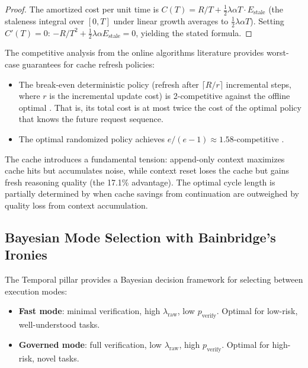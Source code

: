 \documentclass[11pt, a4paper]{googledeepmind}
\begin{document}
\begin{proof}
The amortized cost per unit time is $C(T) = R/T + \frac{1}{2}\lambda\alpha T \cdot E_{\mathrm{stale}}$ (the staleness integral over $[0, T]$ under linear growth averages to $\frac{1}{2}\lambda\alpha T$). Setting $C'(T) = 0$: $-R/T^2 + \frac{1}{2}\lambda\alpha E_{\mathrm{stale}} = 0$, yielding the stated formula.
\end{proof}

The competitive analysis from the online algorithms literature provides worst-case guarantees for cache refresh policies:

\begin{itemize}[nosep]
    \item The break-even deterministic policy (refresh after $\lceil R/r \rceil$ incremental steps, where $r$ is the incremental update cost) is 2-competitive against the offline optimal \citep{sleator1985amortized}. That is, its total cost is at most twice the cost of the optimal policy that knows the future request sequence.
    \item The optimal randomized policy achieves $e/(e-1) \approx 1.58$-competitive \citep{fiat1991competitive}.
\end{itemize}

The cache introduces a fundamental tension: append-only context maximizes cache hits but accumulates noise, while context reset loses the cache but gains fresh reasoning quality (the 17.1\% advantage). The optimal cycle length is partially determined by when cache savings from continuation are outweighed by quality loss from context accumulation.

\subsection{Bayesian Mode Selection with Bainbridge's Ironies}

The Temporal pillar provides a Bayesian decision framework for selecting between execution modes:

\begin{itemize}[nosep]
    \item \textbf{Fast mode}: minimal verification, high $\lambda_{\text{raw}}$, low $p_{\text{verify}}$. Optimal for low-risk, well-understood tasks.
    \item \textbf{Governed mode}: full verification, low $\lambda_{\text{raw}}$, high $p_{\text{verify}}$. Optimal for high-risk, novel tasks.
\end{itemize}
\end{document}
